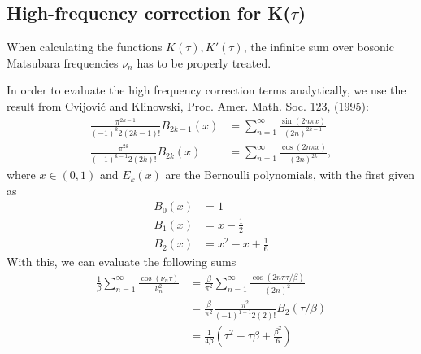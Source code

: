 \documentclass[12pt,a4paper]{scrartcl}
\numberwithin{equation}{section}
\begin{document}

\subsection{High-frequency correction for K($\tau$)}
\label{sec:hf_corr_interaction}
When calculating the functions $K(\tau),K'(\tau)$, the infinite sum over bosonic Matsubara frequencies $\nu_n$ 
has to be properly treated. 

In order to evaluate the high frequency correction terms analytically, we use the result
from Cvijovi\'c and Klinowski, Proc. Amer. Math. Soc. 123, (1995):
\begin{align}
\frac{ \pi^{2k-1} }{ (-1)^k     2(2k-1)! } B_{2k-1}(x) &= \sum\limits_{n=1 }^{\infty} \frac{\sin( 2n\pi x )}{ (2n)^{2k-1} } \\
\frac{ \pi^{2k}   }{ (-1)^{k-1} 2(2k)!   } B_{2k  }(x) &= \sum\limits_{n=1 }^{\infty} \frac{\cos( 2n\pi x )}{ (2n)^{2k  } } ,
\end{align}
where $x\in(0,1)$ and $E_{k}(x)$ are the Bernoulli polynomials, with the first given as
\begin{align}
B_{0}(x) &= 1\\
B_{1}(x) &= x-\frac{1}{2}\\
B_{2}(x) &= x^2 - x + \frac{1}{6}
\end{align}
With this, we can evaluate the following sums
\begin{align}
 \frac{1}{\beta}\sum\limits_{n=1 }^{\infty} \frac{\cos( \nu_n \tau )}{ \nu_n^2 }
 &=\frac{\beta}{\pi^2}\sum\limits_{n=1 }^{\infty} \frac{\cos( 2n\pi \tau/\beta )}{ (2n)^2 }   \\
 &=\frac{\beta}{\pi^2} \frac{ \pi^{2}   }{ (-1)^{1-1} 2(2)!   } B_{2  }(\tau/\beta) \\
 &= \frac{1}{4\beta}\left( \tau^2 - \tau \beta + \frac{\beta^2}{6} \right) \\
\end{align}
\end{document}
